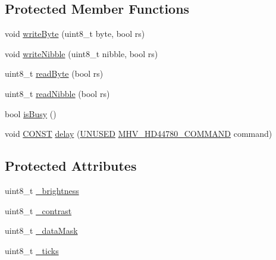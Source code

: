 \subsection*{Protected Member Functions}
\begin{DoxyCompactItemize}
\item 
void \hyperlink{class_m_h_v___display___h_d44780___direct___connect_a2532e2b61f9c0efc5a6fa7e3254bcf75}{write\-Byte} (uint8\-\_\-t byte, bool rs)
\item 
void \hyperlink{class_m_h_v___display___h_d44780___direct___connect_a27fbb4bc11acabfe3aba4bebe5f1ca78}{write\-Nibble} (uint8\-\_\-t nibble, bool rs)
\item 
uint8\-\_\-t \hyperlink{class_m_h_v___display___h_d44780___direct___connect_a3393dfcb69caa33399d6eec1ac78adc0}{read\-Byte} (bool rs)
\item 
uint8\-\_\-t \hyperlink{class_m_h_v___display___h_d44780___direct___connect_a4298659b50d355bc27bbc6b2c64c432b}{read\-Nibble} (bool rs)
\item 
bool \hyperlink{class_m_h_v___display___h_d44780___direct___connect_af2658aa5e006eb03ef3a4a09a05914de}{is\-Busy} ()
\item 
void \hyperlink{_m_h_v__io_8h_a0c33b494a68ce28497e7ce8e5e95feff}{C\-O\-N\-S\-T} \hyperlink{class_m_h_v___display___h_d44780___direct___connect_a4a12809fe1230bae83f787c3c945084d}{delay} (\hyperlink{_m_h_v__io_8h_addf5ec070e9499d36b7f2009ce736076}{U\-N\-U\-S\-E\-D} \hyperlink{_m_h_v___display___h_d44780_8h_a76bff68a0c366080486a09e3beec77e1}{M\-H\-V\-\_\-\-H\-D44780\-\_\-\-C\-O\-M\-M\-A\-N\-D} command)
\end{DoxyCompactItemize}
\subsection*{Protected Attributes}
\begin{DoxyCompactItemize}
\item 
uint8\-\_\-t \hyperlink{class_m_h_v___display___h_d44780___direct___connect_a28772cbdf99b334dede742f6e65ef887}{\-\_\-brightness}
\item 
uint8\-\_\-t \hyperlink{class_m_h_v___display___h_d44780___direct___connect_a1f11cb05bdb7d100c222f3695703fda6}{\-\_\-contrast}
\item 
uint8\-\_\-t \hyperlink{class_m_h_v___display___h_d44780___direct___connect_ad095d81a074d347662bf5a2e571c626c}{\-\_\-data\-Mask}
\item 
uint8\-\_\-t \hyperlink{class_m_h_v___display___h_d44780___direct___connect_a4e3dea8cf7b70750de11858d52044113}{\-\_\-ticks}
\end{DoxyCompactItemize}


